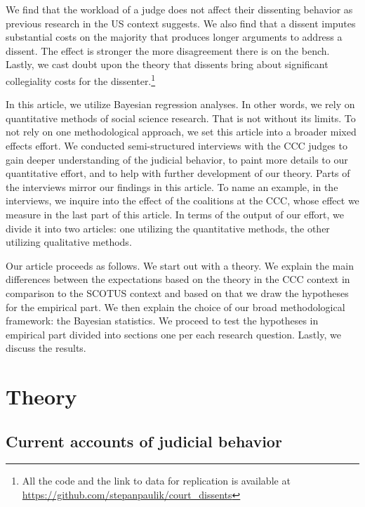 \documentclass[
  11pt,
]{article}
\begin{document}
We find that the workload of a judge does not affect their dissenting
behavior as previous research in the US context suggests. We also find
that a dissent imputes substantial costs on the majority that produces
longer arguments to address a dissent. The effect is stronger the more
disagreement there is on the bench. Lastly, we cast doubt upon the
theory that dissents bring about significant collegiality costs for the
dissenter.\footnote{All the code and the link to data for replication is
  available at \url{https://github.com/stepanpaulik/court_dissents}}

In this article, we utilize Bayesian regression analyses. In other
words, we rely on quantitative methods of social science research. That
is not without its limits. To not rely on one methodological approach,
we set this article into a broader mixed effects effort. We conducted
semi-structured interviews with the CCC judges to gain deeper
understanding of the judicial behavior, to paint more details to our
quantitative effort, and to help with further development of our theory.
Parts of the interviews mirror our findings in this article. To name an
example, in the interviews, we inquire into the effect of the coalitions
at the CCC, whose effect we measure in the last part of this article. In
terms of the output of our effort, we divide it into two articles: one
utilizing the quantitative methods, the other utilizing qualitative
methods.

Our article proceeds as follows. We start out with a theory. We explain
the main differences between the expectations based on the theory in the
CCC context in comparison to the SCOTUS context and based on that we
draw the hypotheses for the empirical part. We then explain the choice
of our broad methodological framework: the Bayesian statistics. We
proceed to test the hypotheses in empirical part divided into sections
one per each research question. Lastly, we discuss the results.

\hypertarget{theory}{%
\section{Theory}\label{theory}}

\hypertarget{current-accounts-of-judicial-behavior}{%
\subsection{Current accounts of judicial
behavior}\label{current-accounts-of-judicial-behavior}}
\end{document}

